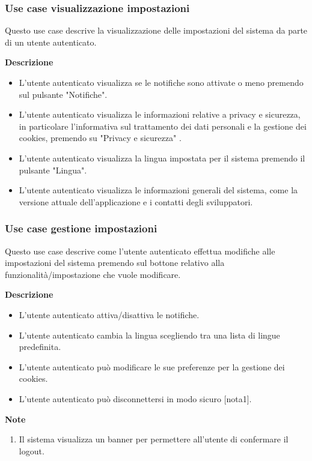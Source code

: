\documentclass[a4paper,12pt]{article}
\begin{document}
\subsubsection*{Use case visualizzazione impostazioni}

Questo use case descrive la visualizzazione delle impostazioni del sistema da parte di un utente autenticato.

\textbf{Descrizione}
\begin{itemize} \setlength\itemsep{0.01em}
\item L'utente autenticato visualizza se le notifiche sono attivate o meno premendo sul pulsante "Notifiche".
\item L'utente autenticato visualizza le informazioni relative a privacy e sicurezza, in particolare l'informativa sul trattamento dei dati personali e la gestione dei cookies, premendo su "Privacy e sicurezza" .
\item L'utente autenticato visualizza la lingua impostata per il sistema premendo il pulsante "Lingua".
\item L'utente autenticato visualizza le informazioni generali del sistema, come la versione attuale dell'applicazione e i contatti degli sviluppatori.
\end{itemize}

\subsubsection*{Use case gestione impostazioni}

Questo use case descrive come l'utente autenticato effettua modifiche alle impostazioni del sistema premendo sul bottone relativo alla funzionalità/impostazione che vuole modificare.

\textbf{Descrizione}
\begin{itemize} \setlength\itemsep{0.01em}
\item L'utente autenticato attiva/disattiva le notifiche.
\item L'utente autenticato cambia la lingua scegliendo tra una lista di lingue predefinita.
\item L'utente autenticato può modificare le sue preferenze per la gestione dei cookies.
\item L'utente autenticato può disconnettersi in modo sicuro [nota1].
\end{itemize}

\textbf{Note}
\begin{enumerate} \setlength\itemsep{0.01em}
\item Il sistema visualizza un banner per permettere all'utente di confermare il logout.
\end{enumerate}
\end{document}
